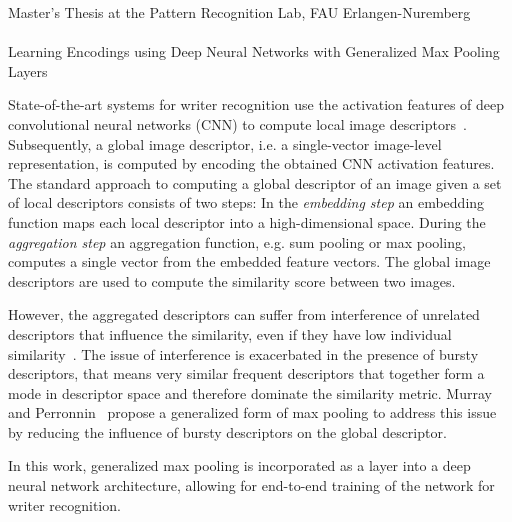 \documentclass[12pt,a4paper]{article}
\begin{document}
\begin{center}
	Master's Thesis at the Pattern Recognition Lab, FAU Erlangen-Nuremberg \hfill \\[5mm]
																				
	\mbox{}\\
	{\Large Learning Encodings using Deep Neural Networks with Generalized Max Pooling Layers}
			
\end{center}


State-of-the-art systems for writer recognition use the activation features of deep convolutional neural networks (CNN) to compute local image descriptors~\cite{Christlein2017Unsupervised,Christlein2017Encoding}. Subsequently, a global image descriptor, i.e. a single-vector image-level representation, is computed by encoding the obtained CNN activation features. The standard approach to computing a global descriptor of an image given a set of local descriptors consists of two steps: In the \emph{embedding step} an embedding function maps each local descriptor into a high-dimensional space. During the \emph{aggregation step} an aggregation function, e.g. sum pooling or max pooling, computes a single vector from the embedded feature vectors.  The global image descriptors are used to compute the similarity score between two images. 

However, the aggregated descriptors can suffer from interference of unrelated descriptors that influence the similarity, even if they have low individual similarity~\cite{murray2017interferences}. The issue of interference is exacerbated in the presence of bursty descriptors, that means very similar frequent descriptors that together form a mode in descriptor space and therefore dominate the similarity metric. Murray and Perronnin~\cite{murray2014generalized} propose a generalized form of max pooling to address this issue by reducing the influence of bursty descriptors on the global descriptor.
		
		
In this work, generalized max pooling is incorporated as a layer into a deep neural network architecture, allowing for end-to-end training of the network for writer recognition. 
		
\end{document}
